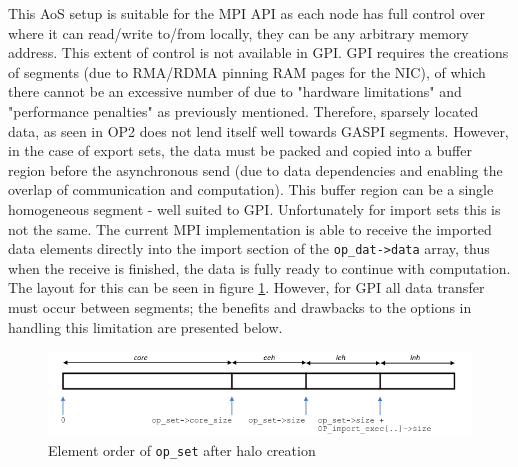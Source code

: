 This AoS setup is suitable for the MPI API as each node has full control over where it can read/write to/from locally, they can be any arbitrary memory address. This extent of control is not available in GPI. GPI requires the creations of segments (due to RMA/RDMA pinning RAM pages for the NIC), of which there cannot be an excessive number of due to "hardware limitations" and "performance penalties" as previously mentioned. Therefore, sparsely located data, as seen in OP2 does not lend itself well towards GASPI segments. However, in the case of export sets, the data must be packed and copied into a buffer region before the asynchronous send (due to data dependencies and enabling the overlap of communication and computation). This buffer region can be a single homogeneous segment - well suited to GPI. Unfortunately for import sets this is not the same. The current MPI implementation is able to receive the imported data elements directly into the import section of the \texttt{op\_dat->data} array, thus when the receive is finished, the data is fully ready to continue with computation. The layout for this can be seen in figure \ref{fig:op_set_layout}. However, for GPI all data transfer must occur between segments; the benefits and drawbacks to the options in handling this limitation are presented below.
\begin{figure}
    \centering
    \includegraphics[width=\linewidth]{figures/op_mpi_set_diagram.png}
    \caption{Element order of \texttt{op\_set} after halo creation}
    \label{fig:op_set_layout}
\end{figure}